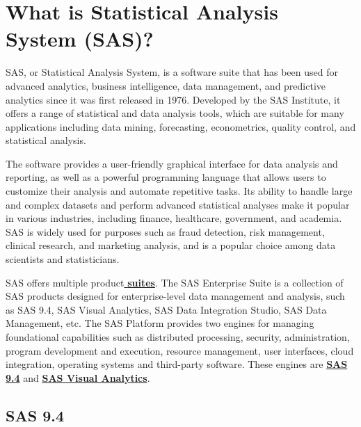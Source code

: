 \section{What is Statistical Analysis System (SAS)?} \label{section: SAS}
SAS, or Statistical Analysis System, is a software suite that has been used for advanced analytics, business intelligence, data management, and predictive analytics since it was first released in 1976. Developed by the SAS Institute, it offers a range of statistical and data analysis tools, which are suitable for many applications including data mining, forecasting, econometrics, quality control, and statistical analysis.

The software provides a user-friendly graphical interface for data analysis and reporting, as well as a powerful programming language that allows users to customize their analysis and automate repetitive tasks. Its ability to handle large and complex datasets and perform advanced statistical analyses make it popular in various industries, including finance, healthcare, government, and academia. SAS is widely used for purposes such as fraud detection, risk management, clinical research, and marketing analysis, and is a popular choice among data scientists and statisticians. 

SAS offers multiple product\href{https://www.sas.com/en_us/software/all-products.html#all-products-a-z}{\textbf{ suites}}. The SAS Enterprise Suite is a collection of SAS products designed for enterprise-level data management and analysis, such as SAS 9.4, SAS Visual Analytics, SAS Data Integration Studio, SAS Data Management, etc. The SAS Platform provides two engines for managing foundational capabilities such as distributed processing, security, administration, program development and execution, resource management, user interfaces, cloud integration, operating systems and third-party software. These engines are \href{https://documentation.sas.com/doc/en/pgmsascdc/9.4_3.5/whatsnew/n17cszme3e52b4n1ooe3710fnuec.htm#:~:text=Initial%20Release%20of%20SAS%209.4,-The%20initial%20release&text=For%20SAS%20administrators%2C%20SAS%209.4,more%20complete%20data%20management%20solution.}{\textbf{SAS 9.4}} and \href{https://documentation.sas.com/doc/en/pgmsascdc/9.4_3.5/pgmsasgswlcm/home.htm}{\textbf{SAS Visual Analytics}}. 

\subsection{SAS 9.4}
\textcolor{red}{\lipsum[1-3]}

